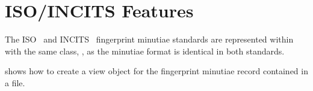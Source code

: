 \section{ISO/INCITS Features}

The ISO~\cite{std:iso19794-2} and INCITS~\cite{std:ansi378-2004} fingerprint
minutiae standards are represented within \sname with the same class,
, as the minutiae format is identical in both standards.

 shows how to create a view object for the
fingerprint minutiae record contained in a file.
